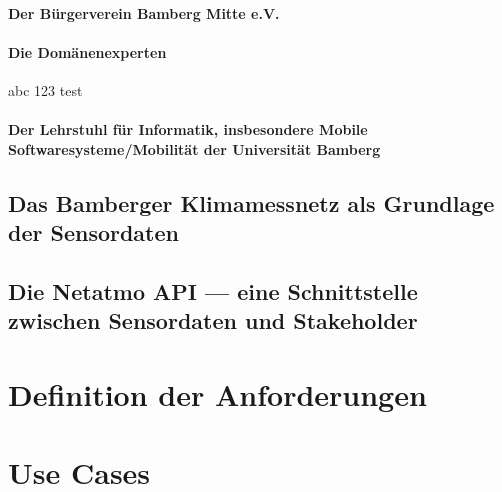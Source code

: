 \paragraph{Der Bürgerverein Bamberg Mitte e.V.}

\paragraph{Die Domänenexperten} abc 123 test

\paragraph{Der Lehrstuhl für Informatik, insbesondere Mobile Softwaresysteme/Mobilität der Universität Bamberg}

\subsection{Das Bamberger Klimamessnetz als Grundlage der Sensordaten}

\subsection{Die Netatmo API --- eine Schnittstelle zwischen Sensordaten und Stakeholder}

\section{Definition der Anforderungen}

\section{Use Cases}
